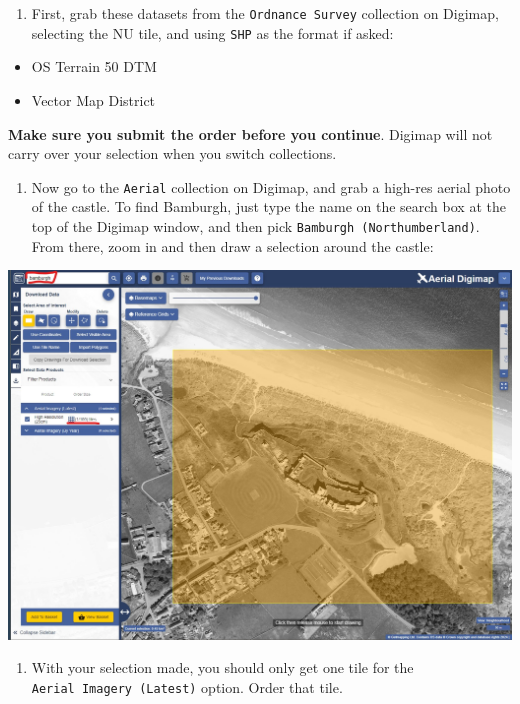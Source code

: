 \documentclass[
  letterpaper,
  DIV=11,
  numbers=noendperiod]{scrreprt}
\providecommand{\tightlist}{%
  \setlength{\itemsep}{0pt}\setlength{\parskip}{0pt}}\usepackage{longtable,booktabs,array}
\begin{document}
\begin{enumerate}
\def\labelenumi{(\arabic{enumi})}
\setcounter{enumi}{188}
\tightlist
\item
  First, grab these datasets from the \texttt{Ordnance\ Survey}
  collection on Digimap, selecting the NU tile, and using \texttt{SHP}
  as the format if asked:
\end{enumerate}

\begin{itemize}
\item
  OS Terrain 50 DTM
\item
  Vector Map District
\end{itemize}

\textbf{Make sure you submit the order before you continue}. Digimap
will not carry over your selection when you switch collections.

\begin{enumerate}
\def\labelenumi{(\arabic{enumi})}
\setcounter{enumi}{189}
\tightlist
\item
  Now go to the \texttt{Aerial} collection on Digimap, and grab a
  high-res aerial photo of the castle. To find Bamburgh, just type the
  name on the search box at the top of the Digimap window, and then pick
  \texttt{Bamburgh\ (Northumberland)}. From there, zoom in and then draw
  a selection around the castle:
\end{enumerate}

\includegraphics{images/lab_7/lab7_fig3_aerial.jpg}

\begin{enumerate}
\def\labelenumi{(\arabic{enumi})}
\setcounter{enumi}{190}
\tightlist
\item
  With your selection made, you should only get one tile for the
  \texttt{Aerial\ Imagery\ (Latest)} option. Order that tile.
\end{enumerate}
\end{document}
